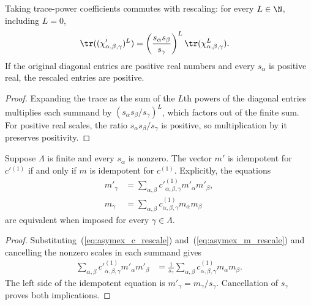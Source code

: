 \begin{lemma}
    \label{thm:asymex_rescale_trace}
    \leanok
    Taking trace-power coefficients commutes with rescaling: for every
    $L\in\N$, including $L=0$,
    \begin{align}
        \tr((\chi'_{\alpha,\beta,\gamma})^L)
         & =
        \left(\frac{s_\alpha s_\beta}{s_\gamma}\right)^L
        \tr(\chi_{\alpha,\beta,\gamma}^L).
    \end{align}
    If the original diagonal entries are positive real numbers and
    every $s_\alpha$ is positive real, the rescaled entries are positive.
\end{lemma}
\begin{proof}
    \leanok
    Expanding the trace as the sum of the $L$th powers of the diagonal
    entries multiplies each summand by $(s_\alpha s_\beta/s_\gamma)^L$,
    which factors out of the finite sum. For positive real scales, the
    ratio $s_\alpha s_\beta/s_\gamma$ is positive, so multiplication by it
    preserves positivity.
\end{proof}

\begin{lemma}
    \label{thm:asymex_rescale_idempotent}
    \leanok
    Suppose $\Lambda$ is finite and every $s_\alpha$ is nonzero.
    The vector $m'$ is idempotent for $c'{}^{(1)}$ if and only if
    $m$ is idempotent for $c^{(1)}$. Explicitly, the equations
    \begin{align}
        m'_\gamma
         & =\sum_{\alpha,\beta}
        c'{}_{\alpha,\beta,\gamma}^{(1)}m'_\alpha m'_\beta,
        \\
        m_\gamma
         & =\sum_{\alpha,\beta}
        c_{\alpha,\beta,\gamma}^{(1)}m_\alpha m_\beta
    \end{align}
    are equivalent when imposed for every $\gamma\in\Lambda$.
\end{lemma}
\begin{proof}
    \leanok
    Substituting~(\ref{eq:asymex_c_rescale})
    and~(\ref{eq:asymex_m_rescale}) and cancelling the nonzero
    scales in each summand gives
    \begin{align}
        \sum_{\alpha,\beta}
        c'{}_{\alpha,\beta,\gamma}^{(1)}m'_\alpha m'_\beta
         & =
        \frac{1}{s_\gamma}
        \sum_{\alpha,\beta}
        c_{\alpha,\beta,\gamma}^{(1)}m_\alpha m_\beta.
    \end{align}
    The left side of the idempotent equation is
    $m'_\gamma=m_\gamma/s_\gamma$. Cancellation of $s_\gamma$
    proves both implications.
\end{proof}

